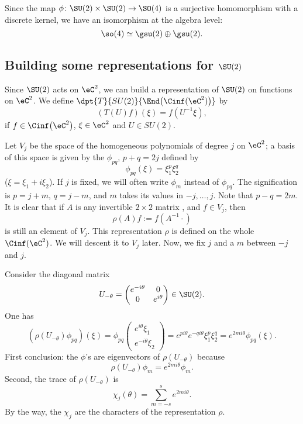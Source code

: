 Since the map $\phi\colon \SU(2)\times \SU(2)\to \SO(4)$ is a surjective homomorphism with a discrete kernel, we have an isomorphism at the algebra level:
\[
	\so(4)\simeq \gsu(2)\oplus\gsu(2).
\]

\subsection{Building some representations for \texorpdfstring{$\SU(2)$}{SU2}}

Since $\SU(2)$ acts on $\eC^2$, we can build a representation of $\SU(2)$ on functions on $\eC^2$. We define $\dpt{T}{SU(2)}{\End\big(\Cinf(\eC^2)\big)}$ by
\[
  (T(U)f)(\xi)=f(U^{-1}\xi),
\]
if $f\in\Cinf\big(\eC^2\big)$, $\xi\in\eC^2$ and $U\in SU(2)$.

Let $V_j$ be the space of the homogeneous polynomials of degree $j$ on $\eC^2$; a basis of this space is given by the $\phi_{pq}$, $p+q=2j$ defined by
\begin{equation}
   \phi_{pq}(\xi)=\xi_1^p\xi_2^q
\end{equation}
($\xi=\xi_1+i\xi_2$). If $j$ is fixed, we will often write $\phi_m$ instead of $\phi_{pq}$. The signification is $p=j+m$, $q=j-m$, and $m$ takes its values in $-j,\ldots,j$. Note that $p-q=2m$. It is clear that if $A$ is any invertible $2\times 2$ matrix , and $f\in V_j$, then
\[
   \rho(A)f:=f(A^{-1} \cdot)
\]
 is still an element of $V_j$. This representation $\rho$ is defined on the whole $\Cinf(\eC^2)$. We will descent it to $V_j$ later.
Now, we fix $j$ and a $m$ between $-j$ and $j$.

Consider the diagonal matrix
\[   U_{-\theta}=\begin{pmatrix}
e^{-i\theta} & 0 \\
0 & e^{i\theta}
\end{pmatrix} \in\SU(2).
\]
One has
\begin{equation}
  \left(\rho(U_{-\theta})\phi_{pq}\right)(\xi)=\phi_{pq}
\begin{pmatrix}
   e^{i\theta}\xi_1 \\
    e^{-i\theta}\xi_2
\end{pmatrix}
                                               = e^{pi\theta} e^{-qi\theta}\xi_1^p\xi_2^q
					       =e^{2mi\theta}\phi_{pq}(\xi).
\end{equation}
First conclusion: the $\phi$'s are eigenvectors of $\rho(U_{-\theta})$ because
\[
   \rho(U_{-\theta})\phi_m=e^{2mi\theta}\phi_m.
\]
Second, the trace of $\rho(U_{-\theta})$ is
\begin{equation}
   \chi_j(\theta)=\sum_{m=-s}^{s}e^{2mi\theta}.
\end{equation}
By the way, the $\chi_j$ are the characters of the representation $\rho$.

